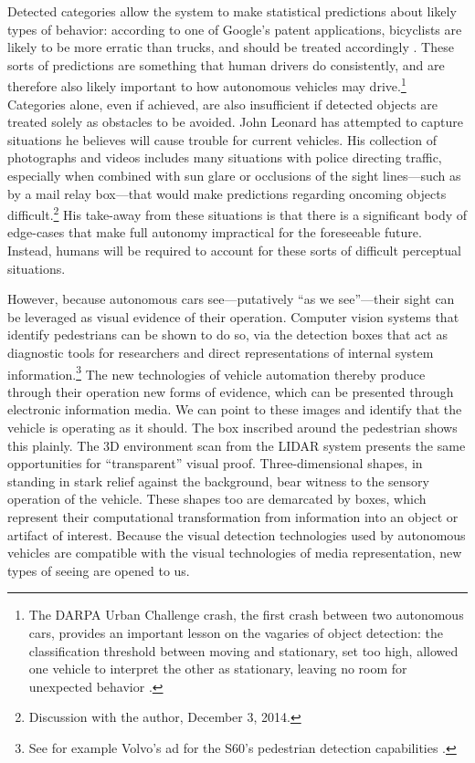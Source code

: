 Detected categories allow the system to make
statistical predictions about likely types of behavior: according to
one of Google's patent applications, bicyclists are likely to be more
erratic than trucks, and should be treated
accordingly \cite{predictPatent}. These sorts of predictions are
something that human drivers do consistently, and are therefore also
likely important to how autonomous vehicles may drive.\footnote{The
  DARPA Urban Challenge crash, the first crash between two autonomous
  cars, provides an important lesson on the vagaries of object
  detection: the classification threshold between moving and
  stationary, set too high, allowed one vehicle to interpret the other
  as stationary, leaving no room for unexpected behavior \cite{collisionPaper}.}
Categories alone, even if achieved, are also insufficient if detected
objects are treated solely as obstacles to be avoided. John Leonard
has attempted to capture situations he believes will cause
trouble for current vehicles. His collection of photographs and videos
includes many situations with police 
directing traffic, especially when combined with sun glare or
occlusions of the sight lines---such as by a mail relay box---that
would make predictions regarding oncoming 
objects difficult.\footnote{Discussion with the author, December 3,
  2014.} His take-away from these situations is that there 
is a significant body of edge-cases that make full autonomy
impractical for the foreseeable future. Instead, humans will be
required to account for these sorts of difficult perceptual situations. 


However, because autonomous cars see---putatively ``as we see''---their sight can
be leveraged as visual evidence of their operation. Computer vision
systems that identify 
pedestrians can be shown to do so, via the detection boxes that act as
diagnostic tools for researchers and direct representations of
internal system information.\footnote{See for example Volvo's ad for
  the S60's pedestrian detection capabilities \cite{volvovideo}.} The new technologies of vehicle
automation thereby produce through 
their operation new forms of evidence, which can be presented through
electronic information media. We can point to these images and identify
that the vehicle is operating as it should. The box inscribed around
the pedestrian shows this plainly. The 3D environment scan from the
LIDAR system presents the same opportunities for ``transparent'' visual
proof. Three-dimensional shapes, in standing in stark relief against
the background, bear witness to the sensory operation of the vehicle.
These shapes too are demarcated by boxes, which represent their
computational transformation from information into an object or
artifact of interest. Because the visual detection technologies used
by autonomous vehicles are compatible with the visual technologies of
media representation, new types of seeing are opened to us.

